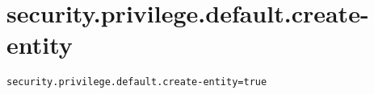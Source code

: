 \section{security.privilege.default.create-entity}
\label{configuration:SecurityPrivilegeDefaultCreateEntity}
\AvailableInJavaOnly{\TODO}
\begin{lstlisting}[style=Props,caption={Usage example for \textit{security.privilege.default.create-entity}}]
security.privilege.default.create-entity=true
\end{lstlisting}